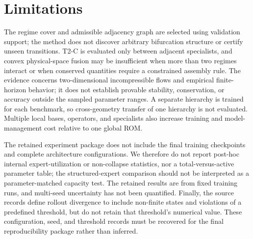\section{Limitations}

The regime cover and admissible adjacency graph are selected using validation support;
the method does not discover arbitrary bifurcation structure or certify unseen
transitions. T2-C is evaluated only between adjacent specialists, and convex
physical-space fusion may be insufficient when more than two regimes interact or when
conserved quantities require a constrained assembly rule. The evidence concerns
two-dimensional incompressible flows and empirical finite-horizon behavior; it does not
establish provable stability, conservation, or accuracy outside the sampled parameter
ranges. A separate hierarchy is trained for each benchmark, so cross-geometry transfer
of one hierarchy is not evaluated. Multiple local bases, operators, and specialists also
increase training and model-management cost relative to one global ROM.

The retained experiment package does not include the final training checkpoints and
complete architecture configurations. We therefore do not report post-hoc internal
expert-utilization or non-collapse statistics, nor a total-versus-active parameter table;
the structured-expert comparison should not be interpreted as a parameter-matched
capacity test. The retained results are from fixed training runs, and multi-seed
uncertainty has not been quantified. Finally, the source records define rollout
divergence to include non-finite states and violations of a predefined threshold, but do
not retain that threshold's numerical value. These configuration, seed, and threshold
records must be recovered for the final reproducibility package rather than inferred.

